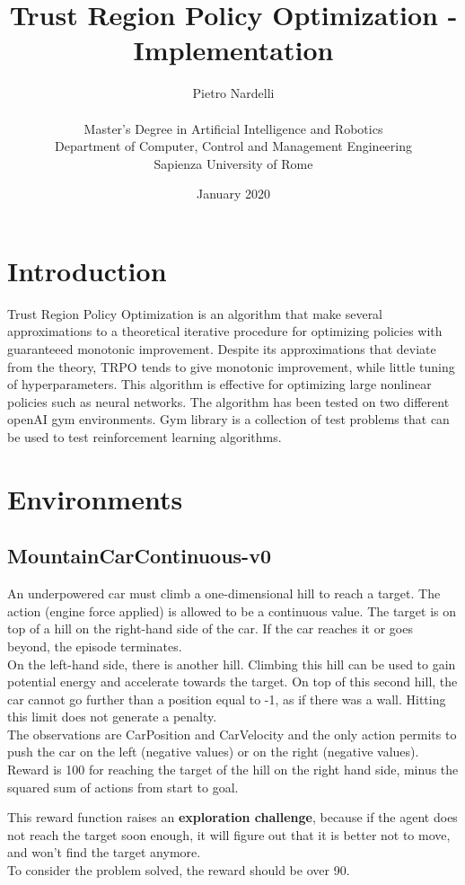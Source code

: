 \documentclass[11pt]{article}
\title{Trust Region Policy Optimization - Implementation}
\author{Pietro Nardelli \\ \\
        Master's Degree in Artificial Intelligence and Robotics \\
        Department of Computer, Control and Management Engineering \\
        Sapienza University of Rome}
\date{January 2020}
\begin{document}
\maketitle

\section{Introduction}
Trust Region Policy Optimization is an algorithm that make several
approximations to a theoretical iterative procedure for optimizing policies with
guaranteeed monotonic improvement. Despite its approximations that deviate from
the theory, TRPO tends to give monotonic improvement, while little tuning of
hyperparameters. This algorithm is effective for optimizing large nonlinear
policies such as neural networks. The algorithm has been tested on two different
openAI gym environments. Gym library is a collection of test problems that can
be used to test reinforcement learning algorithms.

\section{Environments}

\subsection{MountainCarContinuous-v0}
An underpowered car must climb a one-dimensional hill to reach a target. The
action (engine force applied) is allowed to be a continuous value.
The target is on top of a hill on the right-hand side of the car. If the car reaches it or goes beyond, the episode terminates.
\\
On the left-hand side, there is another hill. Climbing this hill can be used to
gain potential energy and accelerate towards the target. On top of this second
hill, the car cannot go further than a position equal to -1, as if there was a
wall. Hitting this limit does not generate a penalty.
\\
The observations are CarPosition and CarVelocity and the only action permits to
push the car on the left (negative values) or on the right (negative values).
\\
Reward is 100 for reaching the target of the hill on the right hand side,
minus the squared sum of actions from start to goal.

This reward function raises an \textbf{exploration challenge}, because if the agent does
not reach the target soon enough, it will figure out that it is better not to move,
and won't find the target anymore.
\\
To consider the problem solved, the reward should be over 90.
\end{document}
